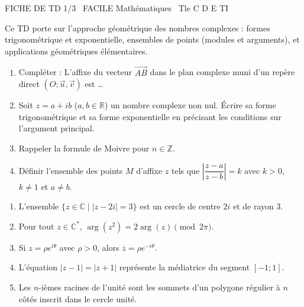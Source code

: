 \documentclass[11pt]{article}
\begin{document}
\begin{tcolorbox}[enhanced,colback=popink,colframe=popink,arc=10pt,boxrule=0pt,left=12pt,right=12pt,top=9pt,bottom=9pt]
{\color{white}\popxbold\small FICHE DE TD 1/3 \textbullet\ FACILE \hfill Mathématiques \textbullet\ Tle C D E TI\par}
\end{tcolorbox}
\vspace{4pt}
Ce TD porte sur l'approche géométrique des nombres complexes : formes trigonométrique et exponentielle, ensembles de points (modules et arguments), et applications géométriques élémentaires.

\begin{exercice}
\begin{enumerate}
    \item Compléter : L'affixe du vecteur $\overrightarrow{AB}$ dans le plan complexe muni d'un repère direct $(O; \vec{u}, \vec{v})$ est \ldots
    \item Soit $z = a + ib$ ($a,b \in \mathbb{R}$) un nombre complexe non nul. Écrire sa forme trigonométrique et sa forme exponentielle en précisant les conditions sur l'argument principal.
    \item Rappeler la formule de Moivre pour $n \in \mathbb{Z}$.
    \item Définir l'ensemble des points $M$ d'affixe $z$ tels que $\left|\dfrac{z-a}{z-b}\right| = k$ avec $k>0$, $k \neq 1$ et $a \neq b$.
\end{enumerate}
\end{exercice}

\begin{exercice}
\begin{enumerate}
    \item L'ensemble $\{z \in \mathbb{C} \mid |z - 2i| = 3\}$ est un cercle de centre $2i$ et de rayon $3$.
    \item Pour tout $z \in \mathbb{C}^*$, $\arg(z^2) = 2\arg(z) \pmod{2\pi}$.
    \item Si $z = \rho e^{i\theta}$ avec $\rho > 0$, alors $\overline{z} = \rho e^{-i\theta}$.
    \item L'équation $|z - 1| = |z + 1|$ représente la médiatrice du segment $[-1; 1]$.
    \item Les $n$-ièmes racines de l'unité sont les sommets d'un polygone régulier à $n$ côtés inscrit dans le cercle unité.
\end{enumerate}
\end{exercice}
\end{document}
